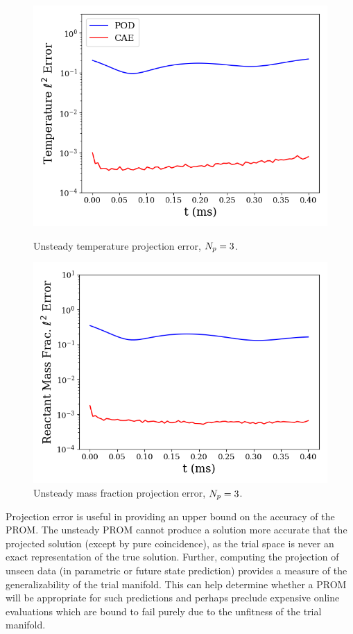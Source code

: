 %
\begin{figure}
    \begin{minipage}{0.45\linewidth}
        \includegraphics[width=0.99\linewidth]{Chapters/ProjROMs/Images/temp_error.png}
        \caption{\label{fig:projErrTempTime}Unsteady temperature projection error, $N_p = 3$.}
    \end{minipage}
    \hspace{1em}
    \begin{minipage}{0.45\linewidth}
        \includegraphics[width=0.99\linewidth]{Chapters/ProjROMs/Images/mf_error.png}
        \caption{\label{fig:projErrMFTime}Unsteady mass fraction projection error, $N_p = 3$.}
    \end{minipage}
\end{figure}
%

Projection error is useful in providing an upper bound on the accuracy of the PROM. The unsteady PROM cannot produce a solution more accurate that the projected solution (except by pure coincidence), as the trial space is never an exact representation of the true solution. Further, computing the projection of unseen data (in parametric or future state prediction) provides a measure of the generalizability of the trial manifold. This can help determine whether a PROM will be appropriate for such predictions and perhaps preclude expensive online evaluations which are bound to fail purely due to the unfitness of the trial manifold.